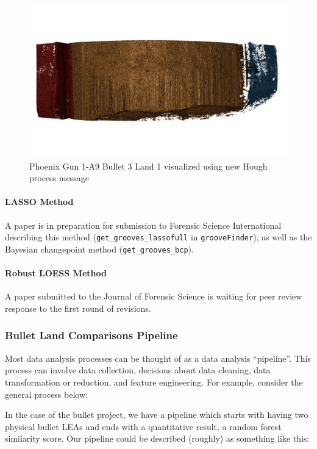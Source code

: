 \documentclass[]{book}
\let\oldparagraph\paragraph
\renewcommand{\paragraph}[1]{\oldparagraph{#1}\mbox{}}
\begin{document}
\begin{figure}

{\centering \includegraphics[width=0.5\linewidth]{images/bullets/Hough_project/phoenix_new_hough_land1} 

}

\caption{Phoenix Gun 1-A9 Bullet 3 Land 1 visualized using new Hough process message}\label{fig:unnamed-chunk-16}
\end{figure}

\hypertarget{lasso-method}{%
\paragraph{LASSO Method}\label{lasso-method}}

A paper is in preparation for submission to Forensic Science International describing this method (\texttt{get\_grooves\_lassofull} in \texttt{grooveFinder}), as well as the Bayesian changepoint method (\texttt{get\_grooves\_bcp}).

\hypertarget{robust-loess-method}{%
\paragraph{Robust LOESS Method}\label{robust-loess-method}}

A paper submitted to the Journal of Forensic Science is waiting for peer review response to the first round of revisions.

\hypertarget{bullet-land-comparisons-pipeline}{%
\subsubsection{Bullet Land Comparisons Pipeline}\label{bullet-land-comparisons-pipeline}}

Most data analysis processes can be thought of as a data analysis ``pipeline''. This process can involve data collection, decisions about data cleaning, data transformation or reduction, and feature engineering. For example, consider the general process below:

In the case of the bullet project, we have a pipeline which starts with having two physical bullet LEAs and ends with a quantitative result, a random forest similarity score. Our pipeline could be described (roughly) as something like this:
\end{document}
